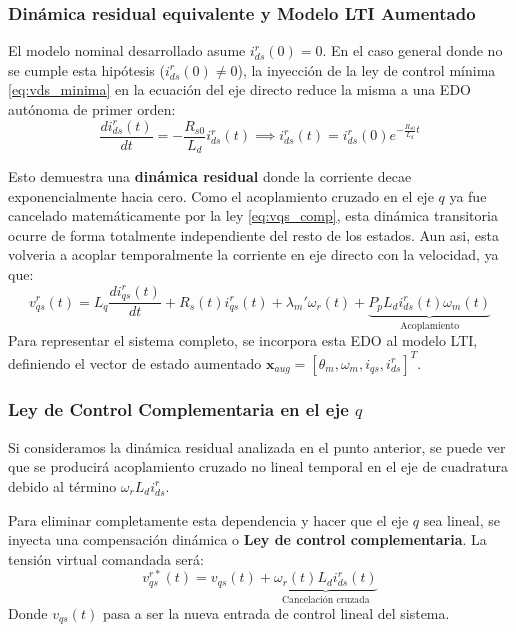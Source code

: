 \documentclass[12pt, a4paper,journal, onecolumn, compsoc]{IEEEtran}
\begin{document}
\subsubsection{Dinámica residual equivalente y Modelo LTI Aumentado}
El modelo nominal desarrollado asume $i_{ds}^r(0) = 0$. En el caso general donde no se cumple esta hipótesis ($i_{ds}^r(0) \neq 0$), la inyección de la ley de control mínima \eqref{eq:vds_minima} en la ecuación del eje directo reduce la misma a una EDO autónoma de primer orden:
\begin{equation}
    \frac{di_{ds}^r(t)}{dt} = -\frac{R_{s0}}{L_d} i_{ds}^r(t) \implies i_{ds}^r(t) = i_{ds}^r(0) e^{-\frac{R_{s0}}{L_d} t}
\end{equation}

Esto demuestra una \textbf{dinámica residual} donde la corriente decae exponencialmente hacia cero. Como el acoplamiento cruzado en el eje $q$ ya fue cancelado matemáticamente por la ley \eqref{eq:vqs_comp}, esta dinámica transitoria ocurre de forma totalmente independiente del resto de los estados. 
Aun asi, esta volveria a acoplar temporalmente la corriente en eje directo con la velocidad, ya que:
\begin{equation*}
    v_{qs}^r(t) = L_q \dfrac{di_{qs}^r(t)}{dt} + R_s(t)i_{qs}^r(t)+\lambda_m'\omega_r(t)+  \underbrace{P_pL_di_{ds}^r(t)\omega_m(t)}_{\text{Acoplamiento}}
\end{equation*}
Para representar el sistema completo, se incorpora esta EDO al modelo LTI, definiendo el vector de estado aumentado $\mathbf{x}_{aug} = [\theta_m, \omega_m, i_{qs}, i_{ds}^r]^T$. 

\subsubsection{Ley de Control Complementaria en el eje $q$}
Si consideramos la dinámica residual analizada en el punto anterior, se puede ver que se producirá acoplamiento cruzado no lineal temporal en el eje de cuadratura debido al término $\omega_r L_d i_{ds}^r$. 

Para eliminar completamente esta dependencia y hacer que el eje $q$ sea lineal, se inyecta una compensación dinámica o \textbf{Ley de control complementaria}. La tensión virtual comandada será:
\begin{equation} \label{eq:vqs_comp}
    v_{qs}^{r*}(t) = v_{qs}(t) + \underbrace{\omega_r(t) L_d i_{ds}^r(t)}_{\text{Cancelación cruzada}}
\end{equation}
Donde $v_{qs}(t)$ pasa a ser la nueva entrada de control lineal del sistema.
\end{document}
